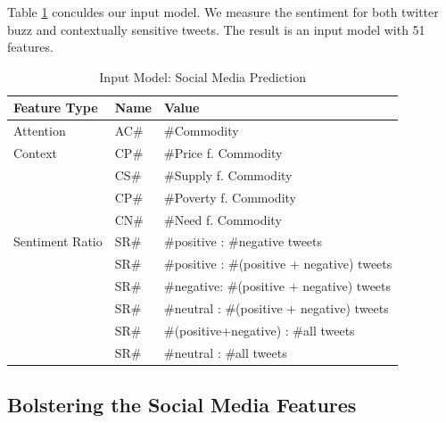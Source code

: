 Table \ref{tab:socio_feat} conculdes our input model. We measure the sentiment for both twitter buzz and contextually sensitive tweets. The result is an input model with 51 features. 
 

\begin{table}[H]
\centering
\begin{tabular}{ |p{3cm}|p{3cm}|p{8cm}| }



 Feature Type & Name & Value    \\
\hline
Attention & AC\# & \#Commodity   \\
\hline
Context & CP\# & \#Price f. Commodity   \\
		& CS\# & \#Supply f. Commodity  \\
		&CP\# & \#Poverty f. Commodity   \\
		&CN\# &\#Need f. Commodity  \\



  \hline
   Sentiment Ratio & SR\#& \#positive : \#negative tweets  \\
      			    & SR\# & \#positive : \#(positive + negative) tweets   \\
 			    & SR\#  & \#negative: \#(positive + negative) tweets  \\
			   &SR\#   & \#neutral : \#(positive + negative) tweets  \\
			    &SR\#  & \#(positive+negative) : \#all tweets   \\			     
			    &SR\#  & \#neutral : \#all tweets \\
                          

   


\end{tabular}
\caption{Input Model: Social Media Prediction}
\label{tab:socio_feat}
\end{table}


\subsection{Bolstering the Social Media Features}

